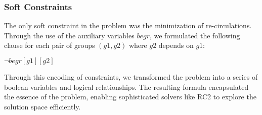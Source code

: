 \subsubsection{Soft Constraints}    

The only soft constraint in the problem was the minimization of re-circulations. Through the use of the auxiliary variables \(begr\), we formulated the following clause for each pair of groups \((g1, g2)\) where \(g2\) depends on \(g1\):
\begin{center}
    \(\lnot begr[g1][g2]\)
\end{center}

Through this encoding of constraints, we transformed the problem into a series of boolean variables and logical relationships. The resulting formula encapsulated the essence of the problem, enabling sophisticated solvers like RC2 to explore the solution space efficiently.